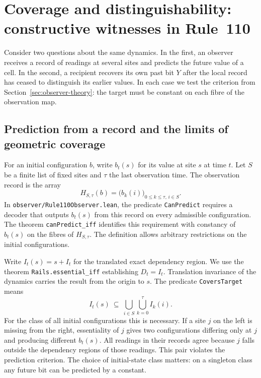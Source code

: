 \section{Coverage and distinguishability: constructive witnesses in Rule~110}
\label{sec:observer-witnesses}

Consider two questions about the same dynamics. In the first, an observer receives a record of readings at several sites and predicts the future value of a cell. In the second, a recipient recovers its own past bit $Y$ after the local record has ceased to distinguish its earlier values. In each case we test the criterion from Section~\ref{sec:observer-theory}: the target must be constant on each fibre of the observation map.

\subsection{Prediction from a record and the limits of geometric coverage}
\label{sec:observer-coverage}

For an initial configuration $b$, write $b_t(s)$ for its value at site $s$ at time $t$. Let $S$ be a finite list of fixed sites and $\tau$ the last observation time. The observation record is the array
\[
 H_{S,\tau}(b)=\bigl(b_k(i)\bigr)_{0\le k\le\tau,\,i\in S}.
\]
In \nolinkurl{observer/Rule110Observer.lean}, the predicate \texttt{CanPredict} requires a decoder that outputs $b_t(s)$ from this record on every admissible configuration. The theorem \texttt{canPredict\_iff} identifies this requirement with constancy of $b_t(s)$ on the fibres of $H_{S,\tau}$. The definition allows arbitrary restrictions on the initial configurations.

Write $I_t(s)=s+I_t$ for the translated exact dependency region. We use the theorem \texttt{Rails.essential\_iff} establishing $D_t=I_t$. Translation invariance of the dynamics carries the result from the origin to $s$. The predicate \texttt{CoversTarget} means
\begin{equation}
 I_t(s)\ \subseteq\ \bigcup_{i\in S}\bigcup_{k=0}^{\tau} I_k(i).
 \label{eq:observer-cover}
\end{equation}
For the class of all initial configurations this is necessary. If a site $j$ on the left is missing from the right, essentiality of $j$ gives two configurations differing only at $j$ and producing different $b_t(s)$. All readings in their records agree because $j$ falls outside the dependency regions of those readings. This pair violates the prediction criterion. The choice of initial-state class matters: on a singleton class any future bit can be predicted by a constant.


